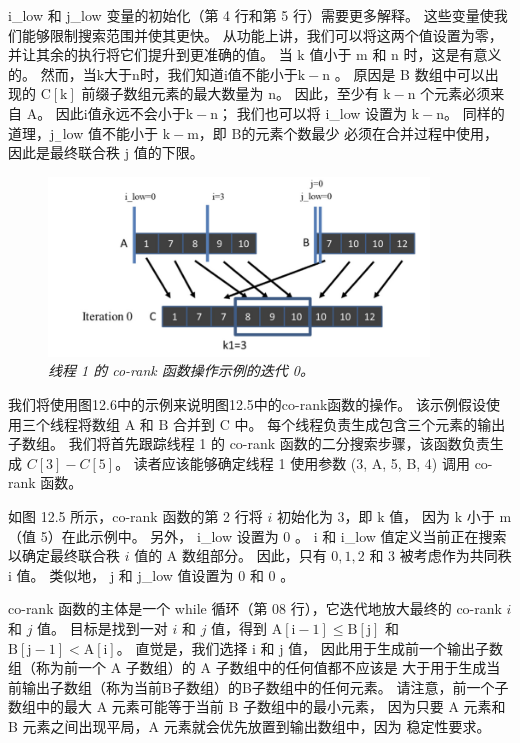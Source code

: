 i\_low 和 j\_low 变量的初始化（第 4 行和第 5 行）需要更多解释。 
这些变量使我们能够限制搜索范围并使其更快。 从功能上讲，我们可以将这两个值设置为零，并让其余的执行将它们提升到更准确的值。 
当 $\mathrm{k}$ 值小于 $\mathrm{m}$ 和 $\mathrm{n}$ 时，这是有意义的。 
然而，当$\mathrm{k}$大于$\mathrm{n}$时，我们知道$\mathrm{i}$值不能小于$\mathrm{k}-\mathrm{n}$ 。 
原因是 B 数组中可以出现的 $\mathrm{C}[\mathrm{k}]$ 前缀子数组元素的最大数量为 $\mathrm{n}$。 
因此，至少有 $\mathrm{k}-\mathrm{n}$ 个元素必须来自 $\mathrm{A}$。 
因此$\mathrm{i}$值永远不会小于$\mathrm{k}-\mathrm{n}$； 
我们也可以将 i\_low 设置为 $\mathrm{k}-\mathrm{n}$。 
同样的道理，$\mathrm{j}_{-}$low 值不能小于 $\mathrm{k}-\mathrm{m}$，即 $\mathrm{B 的元素个数最少 }$ 必须在合并过程中使用，因此是最终联合秩 $\mathrm{j}$ 值的下限。

\begin{figure}[H]
	\centering
	\includegraphics[width=0.9\textwidth]{figs/F12.6.png}
	\caption{\textit{线程 1 的 co-rank 函数操作示例的迭代 0。}}
\end{figure}

我们将使用图12.6中的示例来说明图12.5中的co-rank函数的操作。 
该示例假设使用三个线程将数组 $\mathrm{A}$ 和 $\mathrm{B}$ 合并到 $\mathrm{C}$ 中。 
每个线程负责生成包含三个元素的输出子数组。 
我们将首先跟踪线程 1 的 co-rank 函数的二分搜索步骤，该函数负责生成 $C[3]-C[5]$。 
读者应该能够确定线程 1 使用参数 (3, A, 5, B, 4) 调用 co-rank 函数。

如图 12.5 所示，co-rank 函数的第 2 行将 $i$ 初始化为 3，即 $\mathrm{k}$ 值，
因为 $\mathrm{k}$ 小于 $\mathrm{ m}$（值 5）在此示例中。 另外， i\_low 设置为 0 。 
$\mathrm{i}$ 和 i\_low 值定义当前正在搜索以确定最终联合秩 $i$ 值的 A 数组部分。 
因此，只有 $0,1,2$ 和 3 被考虑作为共同秩 i 值。 类似地， $\mathrm{j}$ 和 j\_low 值设置为 0 和 0 。

co-rank 函数的主体是一个 while 循环（第 08 行），它迭代地放大最终的 co-rank $i$ 和 $j$ 值。 
目标是找到一对 $i$ 和 $j$ 值，得到 $\mathrm{A}[\mathrm{i}-1] \leq \mathrm{B}[\mathrm{j}]$ 
和 $\mathrm{B}[\mathrm{j}-1]<\mathrm{A}[\mathrm{i}]$。 
直觉是，我们选择 $\mathrm{i}$ 和 $\mathrm{j}$ 值，
因此用于生成前一个输出子数组（称为前一个 A 子数组）的 A 子数组中的任何值都不应该是 大于用于生成当前输出子数组（称为当前B子数组）的B子数组中的任何元素。 
请注意，前一个子数组中的最大 A 元素可能等于当前 B 子数组中的最小元素，
因为只要 A 元素和 B 元素之间出现平局，A 元素就会优先放置到输出数组中，因为 稳定性要求。

